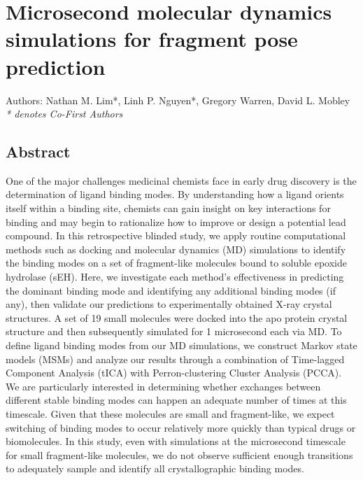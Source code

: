 \chapter{Microsecond molecular dynamics simulations for fragment pose prediction} \label{SEH-MD}

\small{Authors: Nathan M. Lim*, Linh P. Nguyen*, Gregory Warren, David L. Mobley}\\
\small{\textit{* denotes Co-First Authors}}

\section*{Abstract}
One of the major challenges medicinal chemists face in early drug discovery is the determination of ligand binding modes.
By understanding how a ligand orients itself within a binding site, chemists can gain insight on key interactions for binding and may begin to rationalize how to improve or design a potential lead compound. 
In this retrospective blinded study, we apply routine computational methods such as docking and molecular dynamics (MD) simulations to identify the binding modes on a set of fragment-like molecules bound to soluble epoxide hydrolase (sEH).
Here, we investigate each method's effectiveness in predicting the dominant binding mode and identifying any additional binding modes (if any), then validate our predictions to experimentally obtained X-ray crystal structures.
A set of 19 small molecules were docked into the apo protein crystal structure and then subsequently simulated for 1 microsecond each via MD.
To define ligand binding modes from our MD simulations, we construct Markov state models (MSMs) and analyze our results through a combination of Time-lagged Component Analysis (tICA) with Perron-clustering Cluster Analysis (PCCA).
We are particularly interested in determining whether exchanges between different stable binding modes can happen an adequate number of times at this timescale.
Given that these molecules are small and fragment-like, we expect switching of binding modes to occur relatively more quickly than typical drugs or biomolecules.
In this study, even with simulations at the microsecond timescale for small fragment-like molecules, we do not observe sufficient enough transitions to adequately sample and identify all crystallographic binding modes. 

